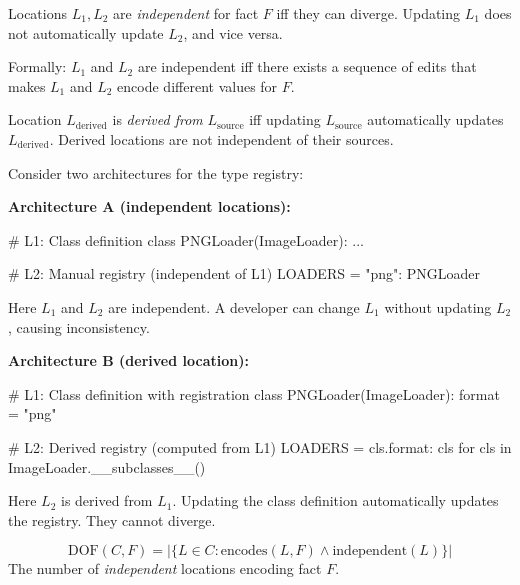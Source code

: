 \begin{definition}\label{def:independent}
Locations $L_1, L_2$ are \emph{independent} for fact $F$ iff they can diverge. Updating $L_1$ does not automatically update $L_2$, and vice versa.

Formally: $L_1$ and $L_2$ are independent iff there exists a sequence of edits that makes $L_1$ and $L_2$ encode different values for $F$.
\end{definition}

\begin{definition}\label{def:derived}
Location $L_{\text{derived}}$ is \emph{derived from} $L_{\text{source}}$ iff updating $L_{\text{source}}$ automatically updates $L_{\text{derived}}$. Derived locations are not independent of their sources.
\end{definition}

\begin{example}\label{ex:independence}
Consider two architectures for the type registry:

\textbf{Architecture A (independent locations):}
\begin{code}
# L1: Class definition
class PNGLoader(ImageLoader): ...

# L2: Manual registry (independent of L1)
LOADERS = {"png": PNGLoader}
\end{code}

Here $L_1$ and $L_2$ are independent. A developer can change $L_1$ without updating $L_2$, causing inconsistency.

\textbf{Architecture B (derived location):}
\begin{code}
# L1: Class definition with registration
class PNGLoader(ImageLoader):
    format = "png"

# L2: Derived registry (computed from L1)
LOADERS = {cls.format: cls for cls in ImageLoader.__subclasses__()}
\end{code}

Here $L_2$ is derived from $L_1$. Updating the class definition automatically updates the registry. They cannot diverge.
\end{example}

\begin{definition}\label{def:dof}
\[
\text{DOF}(C, F) = |\{L \in C : \text{encodes}(L, F) \land \text{independent}(L)\}|
\]
The number of \emph{independent} locations encoding fact $F$.
\end{definition}


